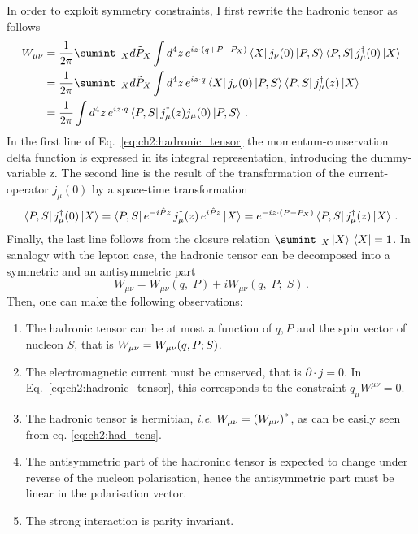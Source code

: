 In order to exploit symmetry constraints, I first rewrite the hadronic tensor as follows
\begin{equation}
    \begin{split}
        W_{\mu\nu} &= \frac{1}{2\pi} \sumint_{\;\;X} \tilde{d P_X} \int d^4z \, e^{iz \cdot \qty(q + P - P_{X})}\bra{X} j_{\nu}(0) \ket{P,S} \bra{P,S} j^{\dag}_{\mu}(0) \ket{X}\\
        & = \frac{1}{2\pi} \sumint_{\;\;X} \tilde{d P_X} \int d^4z \, e^{iz \cdot q}\bra{X} j_{\nu}(0) \ket{P,S} \bra{P,S} j^{\dag}_{\mu}(z) \ket{X} \\
        & = \frac{1}{2\pi} \int d^4z \, e^{i z \cdot q} \bra{P,S} j^{\dag}_{\mu}(z) j_{\mu}(0) \ket{P,S} \,.
    \end{split}
    \label{eq:ch2:hadronic_tensor}
\end{equation}
In the first line of Eq.~\eqref{eq:ch2:hadronic_tensor} the momentum-conservation delta function is expressed in its integral representation, introducing the dummy-variable z. The second line is the result of the transformation of the current-operator $j^{\dag}_{\mu}(0)$ by a space-time transformation 
\begin{equation}
    \bra{P,S} j^{\dag}_{\mu}(0) \ket{X} =  \bra{P,S} e^{-i\hat{P}z} \, j^{\dag}_{\mu}(z) \, e^{i\hat{P}z} \ket{X} =  e^{-i z \cdot \qty(P - P_X )}\bra{P,S} j^{\dag}_{\mu}(z) \ket{X}\,.
\end{equation}
Finally, the last line follows from the closure relation $\sumint_{\;\; X} \ket*{X} \bra*{X} = 1 $. In sanalogy with the lepton case, the hadronic tensor can be decomposed into a symmetric and an antisymmetric part
\begin{equation}
    W_{\mu \nu} =  W_{\mu \nu} (q, \;P ) + i W_{\mu \nu} (q, \;P ; \; S ) \,.
\end{equation}
Then, one can make the following observations:
\begin{enumerate}
    \item The hadronic tensor can be at most a function of $q, P$ and the spin vector of nucleon $S$, that is $W_{\mu \nu} = W_{\mu \nu}\qty(q,P;S)$.  
    \item The electromagnetic current must be conserved, that is $\partial \cdot j = 0$. In Eq.~\eqref{eq:ch2:hadronic_tensor}, this corresponds to the constraint $q_{\mu} W^{\mu \nu} = 0$.
    \item The hadronic tensor is hermitian, \textit{i.e.} $W_{\mu \nu} = \qty(W_{\mu \nu})^{*}$, as can be easily seen from eq. \eqref{eq:ch2:had_tens}. 
    \item The antisymmetric part of the hadroninc tensor is expected to change under reverse of the nucleon polarisation, hence the antisymmetric part must be linear in the polarisation vector.
    \item The strong interaction is parity invariant.
\end{enumerate}
